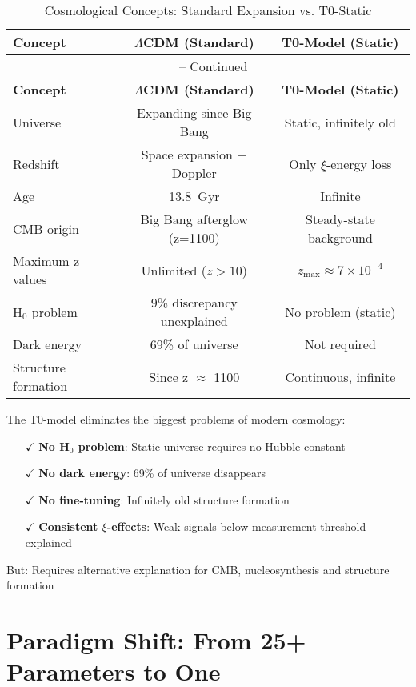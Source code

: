 \documentclass[12pt,a4paper]{article}
\theoremstyle{definition}
\begin{document}
	\begin{longtable}{lcc}
		\caption{Cosmological Concepts: Standard Expansion vs. T0-Static} \\
		\toprule
		\textbf{Concept} & \textbf{$\Lambda$CDM (Standard)} & \textbf{T0-Model (Static)} \\
		\midrule
		\endfirsthead
		\multicolumn{3}{c}{\tablename\ \thetable{} -- Continued} \\
		\toprule
		\textbf{Concept} & \textbf{$\Lambda$CDM (Standard)} & \textbf{T0-Model (Static)} \\
		\midrule
		\endhead
		Universe & Expanding since Big Bang & Static, infinitely old \\
		Redshift & Space expansion + Doppler & Only $\xi$-energy loss \\
		Age & \SI{13.8}{Gyr} & Infinite \\
		CMB origin & Big Bang afterglow (z=1100) & Steady-state background \\
		Maximum z-values & Unlimited ($z > 10$) & $z_{\text{max}} \approx 7 \times 10^{-4}$ \\
		H$_0$ problem & 9\% discrepancy unexplained & No problem (static) \\
		Dark energy & 69\% of universe & Not required \\
		Structure formation & Since z $\approx$ 1100 & Continuous, infinite \\
		\bottomrule
	\end{longtable}
	
	\begin{revolutionary}
		The T0-model eliminates the biggest problems of modern cosmology:
		\begin{itemize}
			\item[$\checkmark$] \textbf{No H$_0$ problem}: Static universe requires no Hubble constant
			\item[$\checkmark$] \textbf{No dark energy}: 69\% of universe disappears
			\item[$\checkmark$] \textbf{No fine-tuning}: Infinitely old structure formation
			\item[$\checkmark$] \textbf{Consistent $\xi$-effects}: Weak signals below measurement threshold explained
		\end{itemize}
		But: Requires alternative explanation for CMB, nucleosynthesis and structure formation
	\end{revolutionary}
	
	\section{Paradigm Shift: From 25+ Parameters to One}
	
\end{document}
